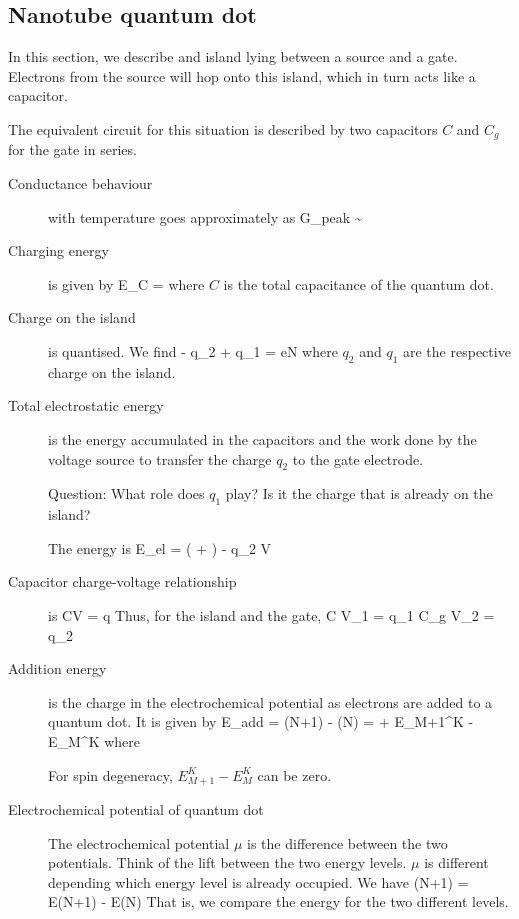 \subsection{Nanotube quantum dot}
In this section, we describe and island lying between a source and a gate. Electrons from the source will hop onto this island, which in turn acts like a capacitor. 

The equivalent circuit for this situation is described by two capacitors $C$ and $C_g$ for the gate in series. 

\begin{description}
\item[Conductance behaviour] with temperature goes approximately as
\beq
G_{peak} \sim {}
\eeq

\item[Charging energy] is given by 
\beq
E_C = 
\eeq
where $C$ is the total capacitance of the quantum dot. 

\item[Charge on the island] is quantised. We find
\beq
- q_2 + q_1 = eN
\eeq
where $q_2$ and $q_1$ are the respective charge on the island. 

\item[Total electrostatic energy] is the energy accumulated in the capacitors and the work done by the voltage source to transfer the charge $q_2$ to the gate electrode. 

Question: What role does $q_1$ play? Is it the charge that is already on the island? 

The energy is
\beq
E_{el} =  \left(  +  \right) - q_2 V
\eeq

\item[Capacitor charge-voltage relationship] is
\beq
CV = q
\eeq
Thus, for the island and the gate, 
\beq
C V_1 = q_1
\eeq
\beq
C_g V_2 = q_2
\eeq


\item[Addition energy] is the charge in the electrochemical potential as electrons are added to a quantum dot. It is given by 
\beq
\Delta E_{add} = \mu(N+1) - \mu(N) =  + E_{M+1}^K - E_M^K
\eeq
where 

For spin degeneracy, $E_{M+1}^K - E_M^K$ can be zero. 

\item[Electrochemical potential of quantum dot] The electrochemical potential $\mu$ is the difference between the two potentials. Think of the lift between the two energy levels. $\mu$ is different depending which energy level is already occupied.  We have
\beq
\mu(N+1) = E(N+1) - E(N)
\eeq
That is, we compare the energy for the two different levels. 




\end{description}

\

